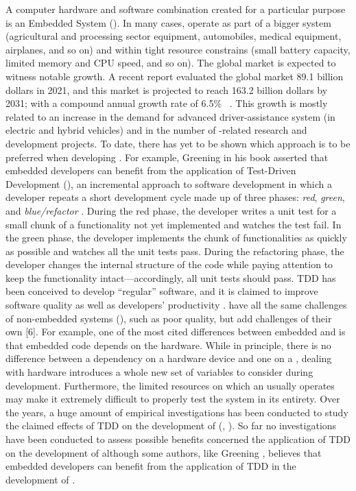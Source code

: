 A computer hardware and software combination created for a particular purpose is an Embedded System (\es). In many cases, \ess operate as part of a bigger system (\eg  agricultural and processing sector equipment, automobiles, medical equipment, airplanes, and so on) and within tight resource constrains (\eg small battery capacity, limited memory and CPU speed, and so on).
The global \ess market is expected to witness notable growth. A recent report evaluated the  global \ess market 89.1 billion dollars in 2021, and this market is projected to reach 163.2 billion dollars by 2031; with a compound annual growth rate of  6.5\%~ \cite{ESSTR2022}. This growth is mostly related to  an increase in the demand for advanced driver-assistance system (in electric and hybrid vehicles) and in the number of \ess-related research and development projects.  
To date, there has yet to be shown which approach is to be preferred when developing \ess. For example, Greening \cite{TDDEC} in his book asserted that embedded developers can benefit from the application of
Test-Driven Development (\tdd), an incremental approach to software development in which a developer repeats a short development cycle made up of three phases: \textit{red}, \textit{green}, and \textit{blue/refactor} \cite{TDDByExample}. During the red phase, the developer writes a unit test for a small chunk of a functionality not yet implemented and watches the test fail. In the green phase, the developer implements the chunk of functionalities as quickly as possible and watches all the unit tests pass. During the refactoring phase, the developer changes the internal structure of the code while paying attention to keep the functionality intact—accordingly, all unit tests should pass. TDD has been conceived to develop “regular” software, and it is claimed to improve software quality as well as developers' productivity \cite{DBLP:reference/se/ErdogmusMJ10}. \ess have all the same challenges of non-embedded systems (\noess), such as poor quality, but add challenges of their own [6]. 
For example, one of the most cited differences between embedded and \noess is that embedded code depends on the hardware. While in principle, there is no difference between a dependency on a hardware device and one on a \noess \cite{TDDEC}, dealing with hardware introduces a whole new set of variables to consider during development. Furthermore, the limited resources on which an \es usually operates may make it extremely difficult to properly test the system in its entirety. 
Over the years, a huge amount of empirical investigations has been conducted to study the claimed effects of TDD on the development of \noess (\eg, \cite{DBLP:journals/software/KaracT18}). So far no investigations have been conducted to assess possible benefits concerned the application of TDD on the development of \ess although some authors, like Greening \cite{TDDEC}, believes that embedded developers can benefit from the application of TDD in the development of \ess.

